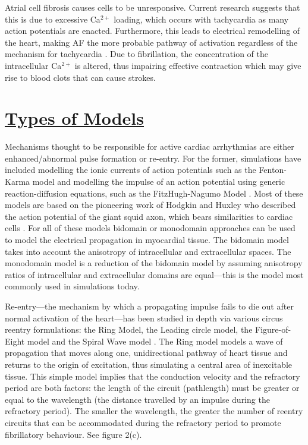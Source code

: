 \documentclass[twocolumn, a1paper]{article}
\begin{document}
Atrial cell fibrosis causes cells to be unresponsive. Current research suggests that this is due to excessive Ca$^{2+}$ loading, which occurs with tachycardia as many action potentials are enacted. Furthermore, this leads to electrical remodelling of the heart, making AF the more probable pathway of activation regardless of the mechanism for tachycardia \cite{Nattel2}. Due to fibrillation, the concentration of the intracellular Ca$^{2+}$ is altered, thus impairing effective contraction which may give rise to blood clots that can cause strokes. %


\section{\textbf{\underline{Types of Models}}} %

Mechanisms thought to be responsible for active cardiac arrhythmias are either enhanced/abnormal pulse formation or re-entry. For the former, simulations have included modelling the ionic currents of action potentials such as the Fenton-Karma model \cite{Grandi} \cite{Fenton} and modelling the impulse of an action potential using generic reaction-diffusion equations, such as the FitzHugh-Nagumo Model \cite{FitzHugh}. Most of these models are based on the pioneering work of Hodgkin and Huxley who described the action potential of the giant squid axon, which bears similarities to cardiac cells \cite{Hodgkin}. %
 For all of these models bidomain or monodomain approaches can be used to model the electrical propagation in myocardial tissue. %
  The bidomain model takes into account the anisotropy of intracellular and extracellular spaces. The monodomain model is a reduction of the bidomain model by assuming anisotropy ratios of intracellular and extracellular domains are equal---this is the model most commonly used in simulations today.%

Re-entry---the mechanism by which a propagating impulse fails to die out after normal activation of the heart---has been studied in depth via various circus reentry formulations: the Ring Model, the Leading circle model, the Figure-of-Eight model and the Spiral Wave model \cite{Antze} \cite{Tusscher}. The Ring model models a wave of propagation that moves along one, unidirectional pathway of heart tissue and returns to the origin of excitation, thus simulating a central area of inexcitable tissue. This simple model implies that the conduction velocity and the refractory period are both factors: the length of the circuit (pathlength) must be greater or equal to the wavelength (the distance travelled by an impulse during the refractory period). The smaller the wavelength, the greater the number of reentry circuits that can be accommodated during the refractory period to promote fibrillatory behaviour. See figure 2(c).
\end{document}
